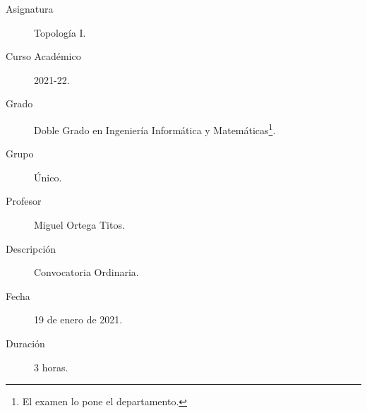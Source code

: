 \documentclass[12pt]{article}
\begin{document}

    
    

    \begin{description}
        \item[Asignatura] Topología I.
        \item[Curso Académico] 2021-22.
        \item[Grado] Doble Grado en Ingeniería Informática y Matemáticas\footnote{El examen lo pone el departamento.}.
        \item[Grupo] Único.
        \item[Profesor] Miguel Ortega Titos.
        \item[Descripción] Convocatoria Ordinaria.
        \item[Fecha] 19 de enero de 2021.
        \item[Duración] 3 horas.
    
    \end{description}
    \newpage
    
\end{document}
